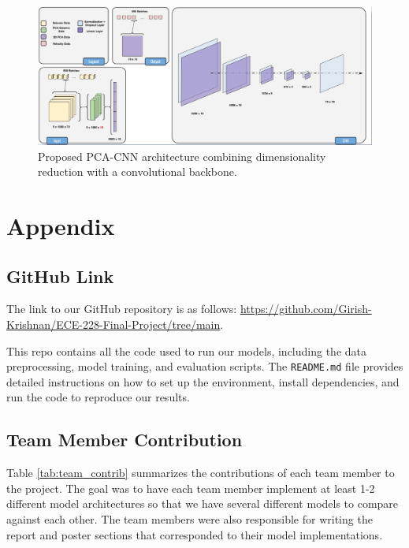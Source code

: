 \documentclass{article}
\newcommand{\instructions}[1]{{\color{blue} #1}}
\begin{document}
\begin{figure}[H]
    \centering
    \includegraphics[width=0.8\linewidth]{figures/conclusion1.png}
    \caption{Proposed PCA-CNN architecture combining dimensionality reduction with a convolutional backbone.}
    \label{fig:conclusion1}
\end{figure}

\newpage
\section*{Appendix}
\subsection*{GitHub Link}

The link to our GitHub repository is as follows: \url{https://github.com/Girish-Krishnan/ECE-228-Final-Project/tree/main}. 

This repo contains all the code used to run our models, including the data preprocessing, model training, and evaluation scripts. The \texttt{README.md} file provides detailed instructions on how to set up the environment, install dependencies, and run the code to reproduce our results.

\subsection*{Team Member Contribution}
Table \ref{tab:team_contrib} summarizes the contributions of each team member to the project. The goal was to have each team member implement at least 1-2 different model architectures so that we have several different models to compare against each other. The team members were also responsible for writing the report and poster sections that corresponded to their model implementations.
\end{document}
